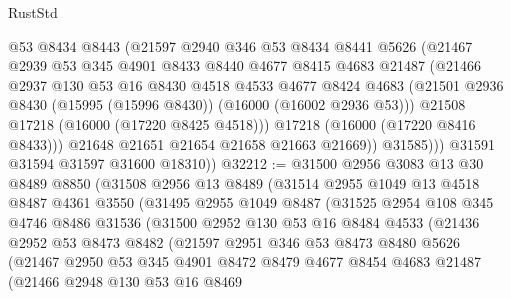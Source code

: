 \begin{lexlean}{RustStd}
\begin{coremodule}
                @53
                @8434
                @8443
                (@21597
                  @2940
                  @346
                  @53
                  @8434
                  @8441
                  @5626
                  (@21467
                    @2939
                    @53
                    @345
                    @4901
                    @8433
                    @8440
                    @4677
                    @8415
                    @4683
                    @21487
                    (@21466
                      @2937
                      @130
                      @53
                      @16
                      @8430
                      @4518
                      @4533
                      @4677
                      @8424
                      @4683
                      (@21501 @2936 @8430 (@15995 (@15996 @8430)) (@16000 (@16002 @2936 @53)))
                      @21508
                      @17218
                      (@16000 (@17220 @8425 @4518)))
                    @17218
                    (@16000 (@17220 @8416 @8433)))
                  @21648
                  @21651
                  @21654
                  @21658
                  @21663
                  @21669))
              @31585)))
        @31591
        @31594
        @31597
        @31600
        @18310))
@32212 := @31500
    @2956
    @3083
    @13
    @30
    @8489
    @8850
    (@31508
      @2956
      @13
      @8489
      (@31514
        @2955
        @1049
        @13
        @4518
        @8487
        @4361
        @3550
        (@31495
          @2955
          @1049
          @8487
          (@31525
            @2954
            @108
            @345
            @4746
            @8486
            @31536
            (@31500
              @2952
              @130
              @53
              @16
              @8484
              @4533
              (@21436
                @2952
                @53
                @8473
                @8482
                (@21597
                  @2951
                  @346
                  @53
                  @8473
                  @8480
                  @5626
                  (@21467
                    @2950
                    @53
                    @345
                    @4901
                    @8472
                    @8479
                    @4677
                    @8454
                    @4683
                    @21487
                    (@21466
                      @2948
                      @130
                      @53
                      @16
                      @8469

\end{coremodule}
\end{lexlean}
